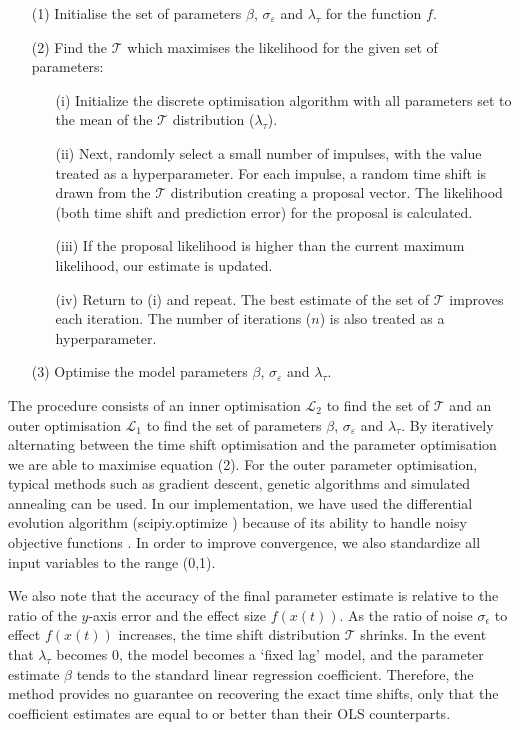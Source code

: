 \documentclass[11pt]{amsart}
\begin{document}
\begin{enumerate}
    \item [(1)] Initialise the set of parameters $\beta$, $\sigma_{\varepsilon}$ and $\lambda_{\tau}$ for the function $f$.
    \item [(2)] Find the $\mathcal{T}$ which maximises the likelihood for the given set of parameters:
        \begin{enumerate} 
            \item[(i)] Initialize the discrete optimisation algorithm with all parameters set to the mean of the $\mathcal{T}$ distribution ($\lambda_{\tau}$).
            \item[(ii)] Next, randomly select a small number of impulses, with the value treated as a hyperparameter. For each impulse, a random time shift is drawn from the $\mathcal{T}$ distribution creating a proposal vector. The likelihood (both time shift and prediction error) for the proposal is calculated. 
            \item[(iii)] If the proposal likelihood is higher than the current maximum likelihood, our estimate is updated.
            \item [(iv)] Return to (i) and repeat. The best estimate of the set of $\mathcal{T}$ improves each iteration. The number of iterations ($n$) is also treated as a hyperparameter.
        \end{enumerate} 
    \item [(3)] Optimise the model parameters $\beta$, $\sigma_{\varepsilon}$ and $\lambda_{\tau}$.

\end{enumerate}
\vspace{5mm} %
The procedure consists of an inner optimisation $\mathcal{L}_2$ to find the set of $\mathcal{T}$ and an outer optimisation $\mathcal{L}_1$ to find the set of parameters $\beta$, $\sigma_{\varepsilon}$ and $\lambda_{\tau}$. 
By iteratively alternating between the time shift optimisation and the parameter optimisation we are able to maximise equation (2). 
For the outer parameter optimisation, typical methods such as gradient descent, genetic algorithms and simulated annealing can be used.  In our implementation, we have used the differential evolution algorithm \cite{diff_ev} (scipiy.optimize \cite{scipy}) because of its ability to handle noisy objective functions \cite{diff_ev}. In order to improve convergence, we also standardize all input variables to the range (0,1).

We also note that the accuracy of the final parameter estimate is relative to the ratio of the $y$-axis error and the effect size $f(x(t))$. 
As the ratio of noise $\sigma_{\epsilon}$ to effect $f(x(t))$ increases, the time shift distribution $\mathcal{T}$ shrinks. 
In the event that $\lambda_{\tau}$ becomes 0, the model becomes a ‘fixed lag’ model, and the parameter estimate $\beta$ tends to the standard linear regression coefficient.
Therefore, the method provides no guarantee on recovering the exact time shifts, only that the coefficient estimates are equal to or better than their OLS counterparts.
\end{document}

